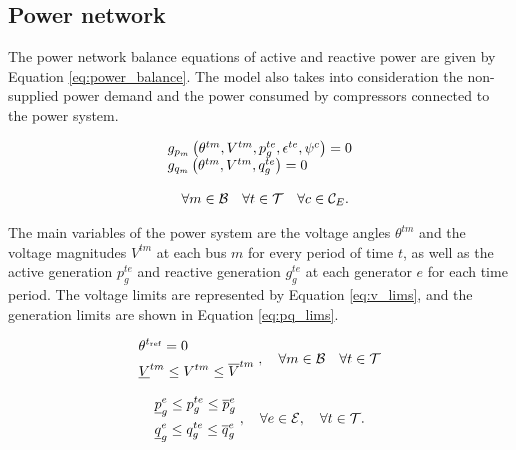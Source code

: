 \subsection{Power network}

The power network balance equations of active and reactive power are given by Equation \ref{eq:power_balance}. The model also takes into consideration the non-supplied power demand and the power consumed by compressors connected to the power system.
 
\begin{equation}
\begin{array}{l}
g_{p_m}\left(\theta^{tm}, V^{tm}, p_{g}^{te}, \epsilon^{te}, \psi^{c}\right) = 0\\ 
g_{q_m}\left(\theta^{tm}, V^{tm}, q_{g}^{te}\right) = 0\\
\\
\quad \forall m \in {\cal{B}} \quad \forall t  \in {\cal{T}} \quad \forall c  \in {\cal{C}}_{E}. 
\end{array}
\label{eq:power_balance}
\vspace{0.3cm}
\end{equation}

The main variables of the power system are the voltage angles $\theta^{tm}$ and the voltage magnitudes $V^{tm}$ at each bus $m$ for every period of time $t$, as well as the active generation $p^{te}_{g}$ and reactive generation $g^{te}_{g}$ at each generator $e$ for each time period. The voltage limits are represented by Equation \ref{eq:v_lims}, and the generation limits are shown in Equation \ref{eq:pq_lims}.

\begin{equation}
\begin{aligned}
&\theta^{t_\text{ref}} = 0\\
&\underline{V}^{tm} \le V^{tm}  \le \overline{V}^{tm}\\
\end{aligned} 
\;,\quad \forall m \in {\cal{B}} \quad \forall t  \in {\cal{T}}  
\label{eq:v_lims}
\end{equation}

\begin{equation}
\begin{aligned}
&\underline{p}_{g}^{e} \le p_{g}^{te}  \le \overline{p}_{g}^{e}\\
&\underline{q}_{g}^{e} \le q_{g}^{te}  \le \overline{q}_{g}^{e}\\
\end{aligned} 
\;,\quad \forall e \in {\cal{E}}, \quad \forall t  \in {\cal{T}}.  
\label{eq:pq_lims}
\vspace{0.3cm}
\end{equation}

